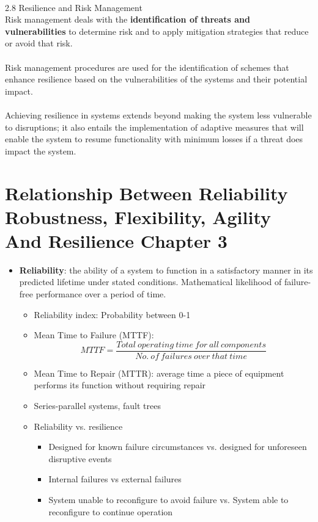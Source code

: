 \\
2.8 Resilience and Risk Management \\
Risk management deals with the \textbf{identification of threats and vulnerabilities} to determine risk and to apply mitigation strategies that reduce or avoid that risk.
\\ \\
Risk management procedures are used for the identification of schemes that enhance resilience based on the vulnerabilities of the systems and their potential impact.
\\
\\
Achieving resilience in systems extends beyond making the system less vulnerable to disruptions; it also entails the implementation of adaptive measures that will enable the system to resume functionality with minimum losses if a threat does impact the system.


\section{Relationship Between Reliability Robustness, Flexibility, Agility And Resilience Chapter 3}
\begin{itemize}
  \item \textbf{Reliability}: the ability of a system to function in a satisfactory manner in its predicted lifetime under stated conditions. Mathematical likelihood of failure-free performance over a  period of time. \\
  \begin{itemize}
    \item Reliability index: Probability between 0-1
    \item Mean Time to Failure (MTTF): \begin{equation}
    	MTTF=\frac{Total\ operating\ time\ for\ all\ components}{No.\ of\ failures\ over\ that\ time}
             \end{equation}
    \item Mean Time to Repair (MTTR): average time a piece of equipment performs its function without requiring repair
    \item Series-parallel systems, fault trees
    \item Reliability vs. resilience
         \begin{itemize}
            \item Designed for known failure circumstances vs. designed for unforeseen disruptive events
            \item Internal failures vs external failures
            \item System unable to reconfigure to avoid failure vs. System able to reconfigure to continue operation
         \end{itemize}
  \end{itemize} 
\end{itemize}
